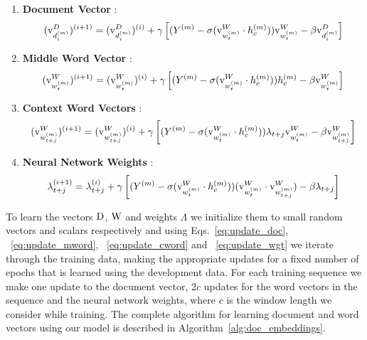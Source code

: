 \begin{enumerate}
\item 
\textbf{Document Vector} : 
\begin{equation}
\label{eq:update_doc}
(\mathrm{v}^{D}_{d^{(m)}_{i}})^{(i+1)} = (\mathrm{v}^{D}_{d^{(m)}_{i}})^{(i)} + \gamma \left[ (Y^{(m)} - \sigma(\mathrm{v}^{W}_{w^{(m)}_{t}} \cdot h^{(m)}_{c}))\mathrm{v}^{W}_{w^{(m)}_{t}} - \beta\mathrm{v}^{D}_{d^{(m)}_{i}} \right]
\end{equation}
\item 
\textbf{Middle Word Vector} : 
\begin{equation}
\label{eq:update_mword}
(\mathrm{v}^{W}_{w^{(m)}_{t}})^{(i+1)} = (\mathrm{v}^{W}_{w^{(m)}_{t}})^{(i)} + \gamma \left[ (Y^{(m)} - \sigma(\mathrm{v}^{W}_{w^{(m)}_{t}} \cdot h^{(m)}_{c})) h^{(m)}_{c} - \beta\mathrm{v}^{W}_{w^{(m)}_{t}} \right]
\end{equation}
\item 
\textbf{Context Word Vectors} : 
\begin{equation}
\label{eq:update_cword}
(\mathrm{v}^{W}_{w^{(m)}_{t+j}})^{(i+1)} = (\mathrm{v}^{W}_{w^{(m)}_{t+j}})^{(i)} + \gamma \left[(Y^{(m)} - \sigma(\mathrm{v}^{W}_{w^{(m)}_{t}} \cdot h^{(m)}_{c}))\lambda_{t+j} \mathrm{v}^{W}_{w^{(m)}_{t}} - \beta\mathrm{v}^{W}_{w^{(m)}_{t+j}} \right]
\end{equation}
\item 
\textbf{Neural Network Weights} : 
\begin{equation}
\label{eq:update_wgt}
\lambda_{t+j}^{(i+1)} = \lambda_{t+j}^{(i)} + \gamma \left[ (Y^{(m)} - \sigma(\mathrm{v}^{W}_{w^{(m)}_{t}} \cdot h^{(m)}_{c}))(\mathrm{v}^{W}_{w^{(m)}_{t}} \cdot \mathrm{v}^{W}_{w^{(m)}_{t+j}}) -\beta\lambda_{t+j} \right]
\end{equation}
\end{enumerate}
To learn the vectors $\mathrm{D}$, $\mathrm{W}$ and weights $\Lambda$ we initialize them to small random vectors and scalars respectively and using Eqs.~\ref{eq:update_doc}, ~\ref{eq:update_mword}, ~\ref{eq:update_cword} and ~\ref{eq:update_wgt} we iterate through the training data, making the appropriate updates for a fixed number of epochs that is learned using the development data. For each training sequence we make one update to the document vector, $2c$ updates for the word vectors in the sequence and the neural network weights, where $c$ is the window length we consider while training. The complete algorithm for learning document and word vectors using our model is described in Algorithm~\ref{alg:doc_embeddings}.

